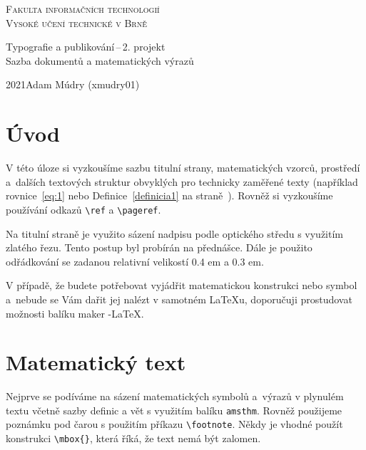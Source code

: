 \documentclass[a4paper, 11pt, twocolumn]{article}
\author{Adam Múdry\\xmudry01@stud.fit.vutbr.cz}
\theoremstyle{definition}
\begin{document}
  \begin{titlepage}
    \begin{center}
      \renewcommand{\baselinestretch}{0.97}
      \Huge\textsc{Fakulta informačních technologií \\
        Vysoké učení technické v Brně} \\

        \renewcommand{\baselinestretch}{1.02}

        \LARGE{
          Typografie a publikování{\,}--{\,}2. projekt \\
          Sazba dokumentů a matematických výrazů \\
        }
      \renewcommand{\baselinestretch}{1}
    \end{center}
    {\Large{2021\hfill Adam Múdry (xmudry01)}}
  \end{titlepage}

  \section*{Úvod}
  \label{sec:uvod}
  V této úloze si vyzkoušíme sazbu titulní strany, matematických vzorců, prostředí 
  a~dalších textových struktur obvyklých pro technicky zaměřené texty 
  (například rovnice~\eqref{eq:1} nebo Definice~\ref{definicia1} na straně~\pageref{sec:uvod}). 
  Rovněž si vyzkoušíme pou\-žívání odkazů \verb|\ref| a \verb|\pageref|.
  
  Na titulní straně je využito sázení nadpisu podle optického středu s využitím zlatého řezu. 
  Tento postup byl probírán na přednášce. Dále je použito odřádkování se zadanou relativní 
  velikostí 0.4 em a 0.3 em.
  
  V případě, že budete potřebovat vyjádřit matematickou konstrukci nebo symbol a~nebude se 
  Vám dařit jej nalézt v samotném {\LaTeX}u, doporučuji prostudovat možnosti ba\-líku maker {\AmS}-{\LaTeX}.

  \section{Matematický text}

  Nejprve se podíváme na sázení matematických symbolů a~výrazů v plynulém textu včetně sazby 
  definic a vět s vy\-užitím balíku \texttt{amsthm}. Rovněž použijeme poznámku pod čarou s použitím 
  příkazu \verb|\footnote|. Někdy je vhodné použít konstrukci \verb|\mbox{}|, která říká, že text nemá být zalomen.
\end{document}
